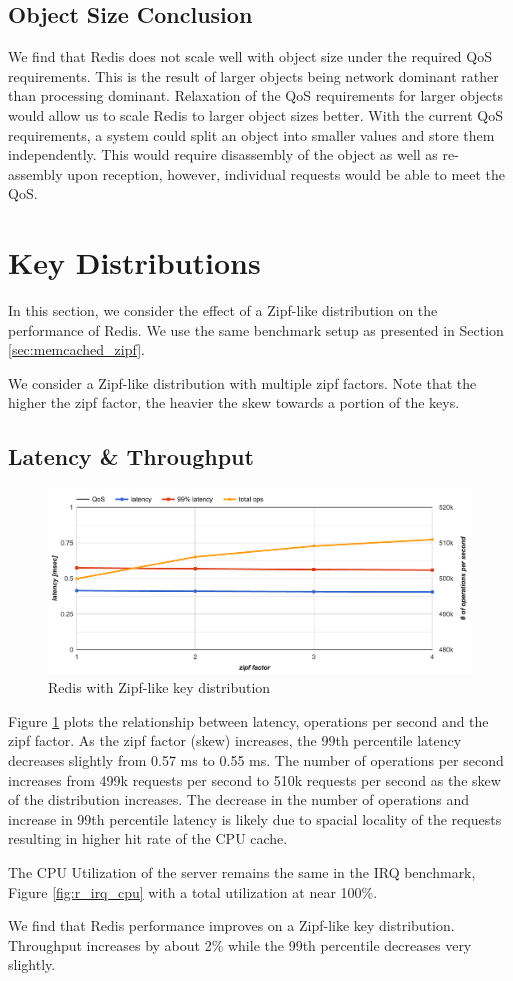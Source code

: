\subsection{Object Size Conclusion}
We find that Redis does not scale well with object size under the required QoS requirements. This is the result of larger objects being network dominant rather than processing dominant. Relaxation of the QoS requirements for larger objects would allow us to scale Redis to larger object sizes better. With the current QoS requirements, a system could split an object into smaller values and store them independently. This would require disassembly of the object as well as re-assembly upon reception, however, individual requests would be able to meet the QoS.

\section{Key Distributions}
In this section, we consider the effect of a Zipf-like distribution on the performance of Redis. We use the same benchmark setup as presented in Section \ref{sec:memcached_zipf}.

We consider a Zipf-like distribution with multiple zipf factors. Note that the higher the zipf factor, the heavier the skew towards a portion of the keys.

\subsection{Latency \& Throughput}
\begin{figure}[h]
    \includegraphics[width=\textwidth]{./res2/r_zipf.png}
    \caption{Redis with Zipf-like key distribution}
    \label{fig:r_zipf}
\end{figure}

Figure \ref{fig:r_zipf} plots the relationship between latency, operations per second and the zipf factor. As the zipf factor (skew) increases, the 99th percentile latency decreases slightly from 0.57 ms to 0.55 ms. The number of operations per second increases from 499k requests per second to 510k requests per second as the skew of the distribution increases. The decrease in the number of operations and increase in 99th percentile latency is likely due to spacial locality of the requests resulting in higher hit rate of the CPU cache.

The CPU Utilization of the server remains the same in the IRQ benchmark, Figure \ref{fig:r_irq_cpu} with a total utilization at near 100\%.

We find that Redis performance improves on a Zipf-like key distribution. Throughput increases by about 2\% while the 99th percentile decreases very slightly.